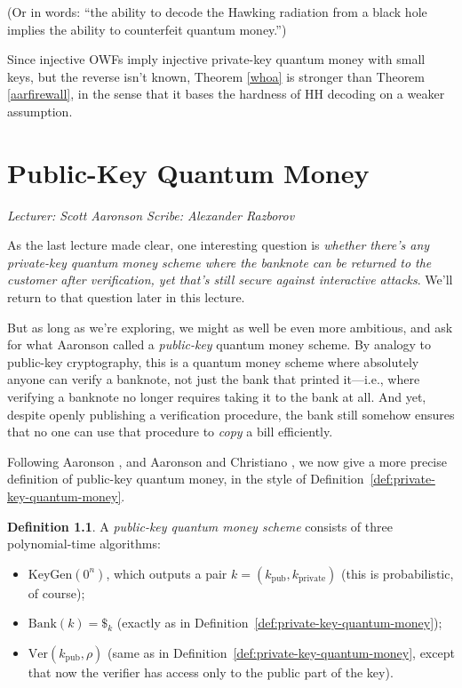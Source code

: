\documentclass[12pt]{report}
\theoremstyle{plain}
\theoremstyle{definition}
\newtheorem{definition}[theorem]{Definition}
\newcommand{\lecture}[3]{%
  \chapter{#3}%
  \vspace{-5ex}%
  \textit{Lecturer: #1 \hfill Scribe: #2}\par%
  \vspace{1ex}\titlerule\vspace{2ex}}
\begin{document}
(Or in words: ``the ability to decode the Hawking radiation from a black hole implies the ability to counterfeit quantum money.'')

Since injective OWFs imply injective private-key quantum money with small keys, but the reverse isn't known, Theorem \ref{whoa} is stronger than Theorem \ref{aarfirewall}, in the sense that it bases the hardness of HH decoding on a weaker assumption.


\lecture{Scott Aaronson}{Alexander Razborov}{Public-Key Quantum Money}

As the last lecture made clear, one interesting question is {\em whether there's any private-key quantum money scheme where the banknote can be returned to the customer after verification, yet that's still secure against interactive attacks}.  We'll return to that question later in this lecture.

But as long as we're exploring, we might as well be even more ambitious, and ask for what Aaronson \cite{Aar09} called a {\em public-key} quantum money scheme.  By analogy to public-key cryptography, this is a quantum money scheme where absolutely anyone can verify a banknote, not just the bank that printed it---i.e., where verifying a banknote no longer requires taking it to the bank at all.  And yet, despite openly publishing a verification procedure, the bank still somehow ensures that no one can use that procedure to {\em copy} a bill efficiently.

Following Aaronson \cite{Aar09}, and Aaronson and Christiano \cite{achristiano}, we now give a more precise definition of public-key quantum money, in the style of Definition~\ref{def:private-key-quantum-money}.

\begin{definition}
A {\em public-key quantum money scheme} consists of three polynomial-time algorithms:
\begin{itemize}
\item $\text{KeyGen}(0^n)$, which outputs a pair $k = (k_{\text{pub}}, k_{\text{private}})$ (this is probabilistic, of course);

\item $\text{Bank}(k)=\$_k$ (exactly as in Definition~\ref{def:private-key-quantum-money});

\item $\text{Ver}(k_{\text{pub}}, \rho)$ (same as in Definition~\ref{def:private-key-quantum-money}, except that now the verifier has access only to the public part of the key).
\end{itemize}
\end{definition}
\end{document}

